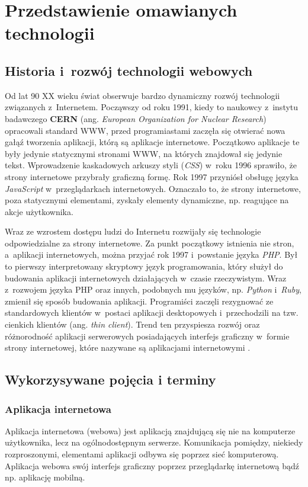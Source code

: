 \chapter{Przedstawienie omawianych technologii}
\section{Historia i~rozwój technologii webowych}
Od lat 90 XX wieku świat obserwuje bardzo dynamiczny rozwój technologii związanych z~Internetem. Począwszy od roku 1991, kiedy to naukowcy z~instytu badawczego \textbf{CERN} (ang. \textit{European Organization for Nuclear Research}) opracowali standard WWW, przed programiastami zaczęła się otwierać nowa gałąź tworzenia aplikacji, którą są aplikacje internetowe. Początkowo aplikacje te były jedynie statycznymi stronami WWW, na których znajdował się jedynie tekst. Wprowadzenie kaskadowych arkuszy styli (\emph{CSS}) w~roku 1996 sprawiło, że strony internetowe przybrały graficzną formę. Rok 1997 przyniósł obsługę języka \emph{JavaScript} w~przeglądarkach internetowych. Oznaczało to, że strony internetowe, poza statycznymi elementami, zyskały elementy dynamiczne, np. reagujące na akcje użytkownika.

Wraz ze wzrostem dostępu ludzi do Internetu rozwijały się technologie odpowiedzialne za strony internetowe. Za punkt początkowy istnienia nie stron, a~aplikacji internetowych, można przyjać rok 1997 i~powstanie języka \emph{PHP}. Był to pierwszy interpretowany skryptowy język programowania, który służył do budowania aplikacji internetowych działających w~czasie rzeczywistym. Wraz z~rozwojem języka PHP oraz innych, podobnych mu języków, np. \emph{Python} i~\emph{Ruby}, zmienił się sposób budowania aplikacji. Programiści zaczęli rezygnować ze standardowych klientów w~postaci aplikacji desktopowych i~przechodzili na tzw. cienkich klientów (ang. \textit{thin client}). Trend ten przyspiesza rozwój oraz różnorodność aplikacji serwerowych posiadających interfejs graficzny w~formie strony internetowej, które nazywane są aplikacjami internetowymi \cite{historia}.

\section{Wykorzysywane pojęcia i terminy}
\subsection{Aplikacja internetowa}
Aplikacja internetowa (webowa) jest aplikacją znajdującą się nie na komputerze użytkownika, lecz na ogólnodostępnym serwerze. Komunikacja pomiędzy, niekiedy rozproszonymi, elementami aplikacji odbywa się poprzez sieć komputerową. Aplikacja webowa swój interfejs graficzny poprzez przeglądarkę internetową bądź np. aplikację mobilną.

